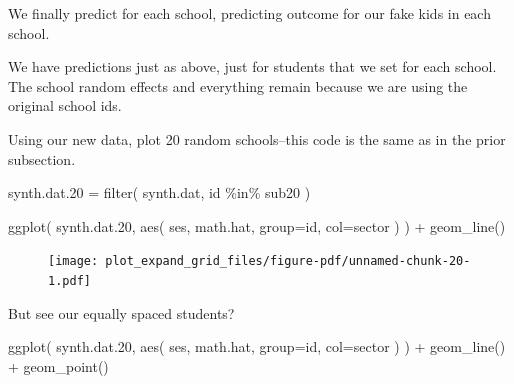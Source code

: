 \documentclass[
  letterpaper,
  DIV=11,
  numbers=noendperiod]{scrreprt}
\newenvironment{Shaded}{\begin{snugshade}}{\end{snugshade}}
\newcommand{\AttributeTok}[1]{\textcolor[rgb]{0.49,0.56,0.16}{#1}}
\newcommand{\FloatTok}[1]{\textcolor[rgb]{0.25,0.63,0.44}{#1}}
\newcommand{\FunctionTok}[1]{\textcolor[rgb]{0.02,0.16,0.49}{#1}}
\newcommand{\NormalTok}[1]{\textcolor[rgb]{0.00,0.44,0.13}{#1}}
\newcommand{\OtherTok}[1]{\textcolor[rgb]{0.00,0.44,0.13}{#1}}
\newcommand{\SpecialCharTok}[1]{\textcolor[rgb]{0.25,0.44,0.63}{#1}}
\begin{document}
We finally predict for each school, predicting outcome for our fake kids
in each school.

\begin{Shaded}
\end{Shaded}

We have predictions just as above, just for students that we set for
each school. The school random effects and everything remain because we
are using the original school ids.

Using our new data, plot 20 random schools--this code is the same as in
the prior subsection.

\begin{Shaded}
\begin{Highlighting}[]
\NormalTok{synth.dat}\FloatTok{.20} \OtherTok{=} \FunctionTok{filter}\NormalTok{( synth.dat, id }\SpecialCharTok{\%in\%}\NormalTok{ sub20 )}

\FunctionTok{ggplot}\NormalTok{( synth.dat}\FloatTok{.20}\NormalTok{, }\FunctionTok{aes}\NormalTok{( ses, math.hat, }\AttributeTok{group=}\NormalTok{id, }\AttributeTok{col=}\NormalTok{sector ) ) }\SpecialCharTok{+}
  \FunctionTok{geom\_line}\NormalTok{()}
\end{Highlighting}
\end{Shaded}

\begin{figure}[H]

{\centering \texttt{[image: plot\_expand\_grid\_files/figure-pdf/unnamed-chunk-20-1.pdf]}

}

\end{figure}

But see our equally spaced students?

\begin{Shaded}
\begin{Highlighting}[]
\FunctionTok{ggplot}\NormalTok{( synth.dat}\FloatTok{.20}\NormalTok{, }\FunctionTok{aes}\NormalTok{( ses, math.hat, }\AttributeTok{group=}\NormalTok{id, }\AttributeTok{col=}\NormalTok{sector ) ) }\SpecialCharTok{+}
  \FunctionTok{geom\_line}\NormalTok{() }\SpecialCharTok{+}
  \FunctionTok{geom\_point}\NormalTok{()}
\end{Highlighting}
\end{Shaded}
\end{document}
